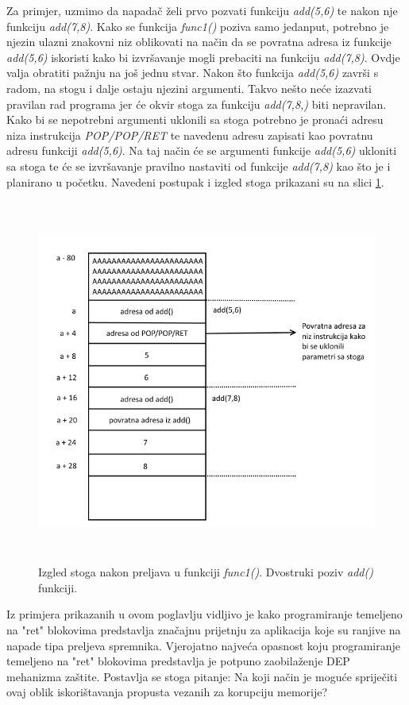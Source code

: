 \documentclass[times, utf8, diplomski, numeric]{fer}
\begin{document}
Za primjer, uzmimo da napadač želi prvo pozvati funkciju \emph{add(5,6)} te nakon nje funkciju \emph{add(7,8)}. Kako se funkcija \emph{func1()} poziva samo jedanput, potrebno je njezin ulazni znakovni niz oblikovati na način da se povratna adresa iz funkcije \emph{add(5,6)} iskoristi kako bi izvršavanje mogli prebaciti na funkciju \emph{add(7,8)}. Ovdje valja obratiti pažnju na još jednu stvar. Nakon što funkcija \emph{add(5,6)} završi s radom, na stogu i dalje ostaju njezini argumenti. Takvo nešto neće izazvati pravilan rad programa jer će okvir stoga za funkciju \emph{add(7,8,)} biti nepravilan. Kako bi se nepotrebni argumenti uklonili sa stoga potrebno je pronaći adresu niza instrukcija \emph{POP/POP/RET} te navedenu adresu zapisati kao povratnu adresu funkciji \emph{add(5,6)}. Na taj način će se argumenti funkcije \emph{add(5,6)} ukloniti sa stoga te će se izvršavanje pravilno nastaviti od funkcije \emph{add(7,8)} kao što je i planirano u početku. Navedeni postupak i izgled stoga prikazani su na slici \ref{fig:rop_add78}. 
\begin{figure}[!htb]
\centering
\setlength\fboxsep{0pt}
\setlength\fboxrule{0.5pt}
\includegraphics[width=12cm, height=12cm]{slike/rop_add78}
\caption{Izgled stoga nakon preljava u funkciji \emph{func1()}. Dvostruki poziv \emph{add()} funkciji.}
\label{fig:rop_add78} 
\end{figure}
Iz primjera prikazanih u ovom poglavlju vidljivo je kako programiranje temeljeno na "ret" blokovima predstavlja značajnu prijetnju za aplikacija koje su ranjive na napade tipa preljeva spremnika. Vjerojatno najveća opasnost koju programiranje temeljeno na "ret" blokovima predstavlja je potpuno zaobilaženje DEP mehanizma zaštite. Postavlja se stoga pitanje: Na koji način je moguće spriječiti ovaj oblik iskorištavanja propusta vezanih za korupciju memorije? 
\end{document}
